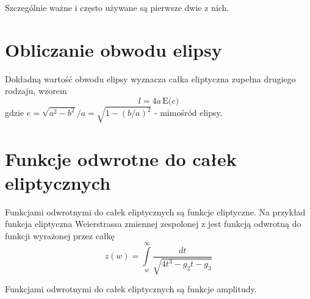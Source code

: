 \documentclass{article}
\begin{document}
Szczególnie ważne i często używane są pierwsze dwie z nich. 

\section*{Obliczanie obwodu elipsy}
Dokładną wartość obwodu elipsy wyznacza całka eliptyczna zupełna drugiego rodzaju, wzorem
$$ l=4a\,{\text{E}}{\big (}e{\big )} $$
gdzie $ e={\sqrt {a^{2}-b^{2}}}/a={\sqrt {1-(b/a)^{2}}} $ - mimośród elipsy.

\section*{Funkcje odwrotne do całek eliptycznych}
Funkcjami odwrotnymi do całek eliptycznych są funkcje eliptyczne. Na przykład funkcja eliptyczna Weierstrassa zmiennej zespolonej z jest funkcją odwrotną do funkcji wyrażonej przez całkę 
\[ z(w)=\int \limits _{w}^{\infty }{\frac {dt}{\sqrt {4t^{3}-g_{2}t-g_{3}}}} \]

Funkcjami odwrotnymi do całek eliptycznych są funkcje amplitudy. 
\end{document}
